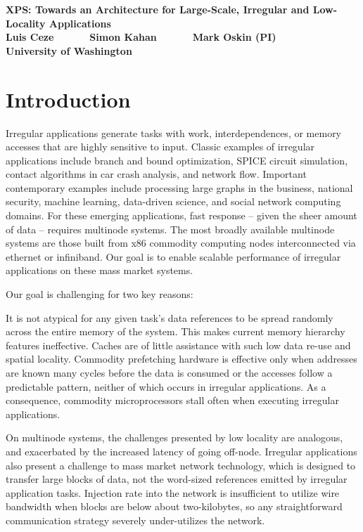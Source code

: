 


\begin{center}
  \textbf{\Large XPS: Towards an Architecture for Large-Scale, Irregular and Low-Locality Applications}\\ \vspace{5mm}
  \textbf{Luis Ceze ~~~~~ Simon Kahan ~~~~~ Mark Oskin (PI)}\\
  \textbf{University of Washington}
\end{center}

\section{Introduction}

Irregular applications generate tasks with work, interdependences, or memory
accesses that are highly sensitive to input. Classic examples of irregular
applications include branch and bound optimization, SPICE circuit simulation,
contact algorithms in car crash analysis, and network flow. Important
contemporary examples include processing large graphs in the business,
national security, machine learning, data-driven science, and social network
computing domains. For these emerging applications, fast response -- given the
sheer amount of data -- requires multinode systems. The most broadly available
multinode systems are those built from x86 commodity computing nodes
interconnected via ethernet or infiniband. Our goal is to enable scalable
performance of irregular applications on these mass market systems.

Our goal is challenging for two key reasons: 

It is not atypical for any given task's data references to be spread
randomly across the entire memory of the system. This makes current
memory hierarchy features ineffective. Caches are of little assistance
with such low data re-use and spatial locality. Commodity prefetching
hardware is effective only when addresses are known many cycles before
the data is consumed or the accesses follow a predictable pattern,
neither of which occurs in irregular applications. As a consequence,
commodity microprocessors stall often when executing irregular
applications.

 On multinode systems, the challenges presented by low
locality are analogous, and exacerbated by the increased latency of going
off-node. Irregular applications also present a challenge to mass market
network technology, which is designed to transfer large blocks of data, not
the word-sized references emitted by irregular application tasks. Injection
rate into the network is insufficient to utilize wire bandwidth when blocks
are below about two-kilobytes, so any straightforward communication strategy
severely under-utilizes the network. 

